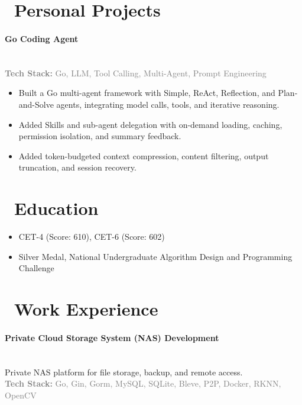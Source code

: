 \documentclass{styles/resume}
\begin{document}
\section{\faCode\ Personal Projects}
\paragraph*{Go Coding Agent}\mbox{}\\
{\small
\noindent\textcolor{gray}{\textbf{Tech Stack:} Go, LLM, Tool Calling, Multi-Agent, Prompt Engineering}
}
\vspace{0.3ex}

\begin{itemize}
    \item Built a Go multi-agent framework with Simple, ReAct, Reflection, and Plan-and-Solve agents, integrating model calls, tools, and iterative reasoning.
    \item Added Skills and sub-agent delegation with on-demand loading, caching, permission isolation, and summary feedback.
    \item Added token-budgeted context compression, content filtering, output truncation, and session recovery.
\end{itemize}

\section{\faGraduationCap\ Education}
\begin{itemize}
\item CET-4 (Score: 610), CET-6 (Score: 602)
\item Silver Medal, National Undergraduate Algorithm Design and Programming Challenge
\end{itemize}

\section{\faSuitcase\ Work Experience}

\paragraph*{Private Cloud Storage System (NAS) Development}\mbox{}\\
{\small
\noindent Private NAS platform for file storage, backup, and remote access.\\
\noindent\textcolor{gray}{\textbf{Tech Stack:} Go, Gin, Gorm, MySQL, SQLite, Bleve, P2P, Docker, RKNN, OpenCV}
}
\vspace{0.3ex}
\vspace{0.3ex}
\end{document}
